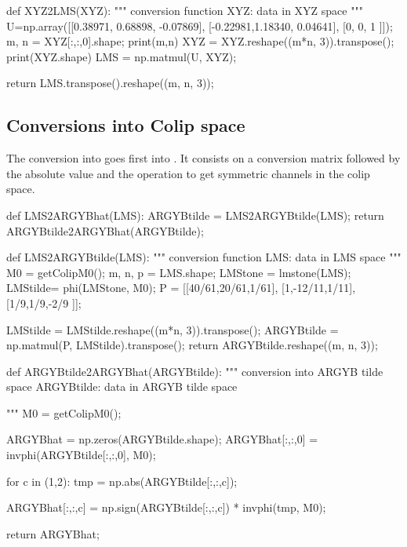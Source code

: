 \begin{python}
def XYZ2LMS(XYZ):
    """
    conversion function
    XYZ: data in XYZ space
    """
    U=np.array([[0.38971, 0.68898, -0.07869],
		[-0.22981,1.18340,  0.04641],
		[0,       0,        1      ]]);
    m, n = XYZ[:,:,0].shape;
    print(m,n)
    XYZ = XYZ.reshape((m*n, 3)).transpose();
    print(XYZ.shape)
    LMS = np.matmul(U, XYZ);
    
    return LMS.transpose().reshape((m, n, 3));
\end{python}

\subsection{Conversions into Colip space}
The conversion into \cargyb  goes first into \targyb. It consists on a conversion matrix followed by the absolute value and the operation to get symmetric channels in the colip space.
\begin{python}
def LMS2ARGYBhat(LMS):
    ARGYBtilde = LMS2ARGYBtilde(LMS);
    return ARGYBtilde2ARGYBhat(ARGYBtilde);
\end{python}

\begin{python}
 def LMS2ARGYBtilde(LMS):
    """
    conversion function
    LMS: data in LMS space
    """
    M0 = getColipM0();
    m, n, p = LMS.shape;
    LMStone = lmstone(LMS);
    LMStilde= phi(LMStone, M0);
    P = [[40/61,20/61,1/61], [1,-12/11,1/11], [1/9,1/9,-2/9 ]];
    
    LMStilde = LMStilde.reshape((m*n, 3)).transpose();
    ARGYBtilde = np.matmul(P, LMStilde).transpose();
    return ARGYBtilde.reshape((m, n, 3));
    \end{python}
    
\begin{python}
def ARGYBtilde2ARGYBhat(ARGYBtilde):
    """
    conversion into ARGYB tilde space
    ARGYBtilde: data in ARGYB tilde space
    
    """
    M0 = getColipM0();
    
    ARGYBhat = np.zeros(ARGYBtilde.shape);
    ARGYBhat[:,:,0] = invphi(ARGYBtilde[:,:,0], M0);
    
    for c in (1,2):
        tmp = np.abs(ARGYBtilde[:,:,c]);
        
        ARGYBhat[:,:,c] = np.sign(ARGYBtilde[:,:,c]) * invphi(tmp, M0);
        
    return ARGYBhat;
    \end{python}



